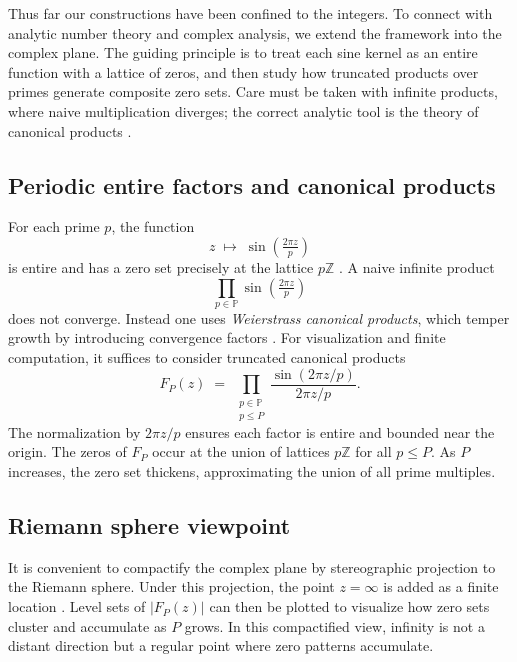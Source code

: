 \documentclass[12pt]{article}
\theoremstyle{definition}
\theoremstyle{remark}
\newcommand{\Z}{\mathbb{Z}}
\newcommand{\Primes}{\mathbb{P}}
\begin{document}
Thus far our constructions have been confined to the integers. To connect with analytic number theory 
and complex analysis, we extend the framework into the complex plane. 
The guiding principle is to treat each sine kernel as an entire function with a lattice of zeros, 
and then study how truncated products over primes generate composite zero sets. 
Care must be taken with infinite products, where naive multiplication diverges; 
the correct analytic tool is the theory of canonical products 
\citep{conway1978functions,ahlfors1979complex,stein2003complex}.

\subsection{Periodic entire factors and canonical products}

For each prime \(p\), the function
\[
z \;\mapsto\; \sin\!\left(\tfrac{2\pi z}{p}\right)
\]
is entire and has a zero set precisely at the lattice \(p\Z\) 
\citep{stein2003complex}. 
A naive infinite product
\[
\prod_{p\in\Primes} \sin\!\left(\tfrac{2\pi z}{p}\right)
\]
does not converge. Instead one uses \emph{Weierstrass canonical products}, 
which temper growth by introducing convergence factors 
\citep{remmert1998classical,conway1978functions}. 
For visualization and finite computation, it suffices to consider truncated canonical products
\[
F_P(z) \;=\;\prod_{\substack{p\in\Primes\\ p\le P}}
\frac{\sin(2\pi z/p)}{2\pi z/p}.
\]
The normalization by \(2\pi z/p\) ensures each factor is entire and bounded near the origin. 
The zeros of \(F_P\) occur at the union of lattices \(p\Z\) for all \(p\le P\). 
As \(P\) increases, the zero set thickens, approximating the union of all prime multiples.

\subsection{Riemann sphere viewpoint}

It is convenient to compactify the complex plane by stereographic projection to the Riemann sphere. 
Under this projection, the point \(z=\infty\) is added as a finite location 
\citep{ahlfors1979complex,needham1997visual}. 
Level sets of \(|F_P(z)|\) can then be plotted to visualize how zero sets cluster 
and accumulate as \(P\) grows. 
In this compactified view, infinity is not a distant direction but a regular point where zero patterns accumulate.
\end{document}

